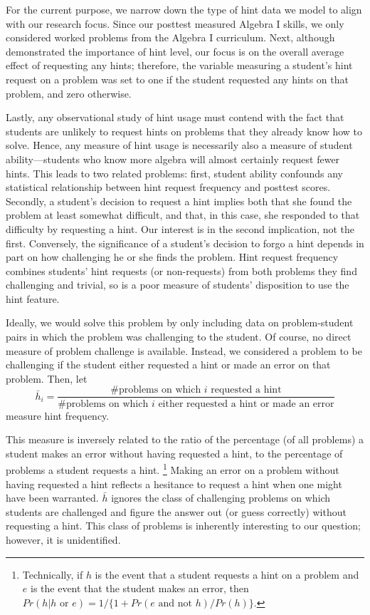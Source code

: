 \documentclass{article}\usepackage[]{graphicx}\usepackage[]{color}
\begin{document}
For the current purpose, we narrow down the type
of hint data we model to align with our research focus.
Since our posttest measured Algebra I skills, we only
considered worked problems from the Algebra I curriculum.
Next, although \citet{goldin2012learner} demonstrated the importance
of hint level, our focus is on the overall average effect of
requesting any hints; therefore, the variable measuring a student's
hint request on a problem was set to one if the student requested any
hints on that problem, and zero otherwise.

Lastly, any observational study of hint usage must contend with the
fact that students are unlikely to request hints on problems that they
already know how to solve.
Hence, any measure of hint usage is necessarily also a measure of
student ability---students who know more algebra will almost certainly
request fewer hints.
This leads to two related problems: first, student ability
confounds any statistical relationship between hint request frequency
and posttest scores.
Secondly,
a student's decision to request a hint implies both that she
found the problem at least somewhat difficult, and that, in this case,
she responded to that difficulty by requesting a hint.
Our interest is in the second implication, not the first.
Conversely, the significance of a student's decision to forgo a hint
depends in part on how challenging he or she finds the problem.
Hint request frequency combines students' hint requests (or non-requests) from both
problems they find challenging and trivial, so is a poor measure of
students' disposition to use the hint feature.

Ideally, we would solve this problem by only including data on
problem-student pairs in which the problem was challenging to the
student.
Of course, no direct measure of problem challenge is available.
Instead, we considered a problem to be challenging if the student
either requested a hint or made an error on that problem.
Then, let
\begin{equation*}
\bar{h}_i=\frac{\text{\# problems on which }i\text{ requested a
    hint}}{\text{\# problems on which }i\text{ either requested a hint
    or made an error}}
\end{equation*}
measure hint frequency.

This measure is inversely related to the ratio of the percentage (of
all
problems) a student makes an error without having requested a hint,
to the percentage of problems a student requests a hint.%
\footnote{Technically, if $h$ is the event that a student requests
a hint on a problem and $e$ is the event that the student makes
an error, then $Pr(h|h\text{ or }e)=1/\{1+Pr(e\text{ and not }h)/Pr(h)\}$.}
Making an error on a problem without having requested a hint reflects
a hesitance to request a hint when one might have been warranted.
$\bar{h}$ ignores the class of challenging problems on which students
are challenged and figure the answer out (or guess correctly) without
requesting a hint.
This class of problems is inherently interesting to our question;
however, it is unidentified.
\end{document}
